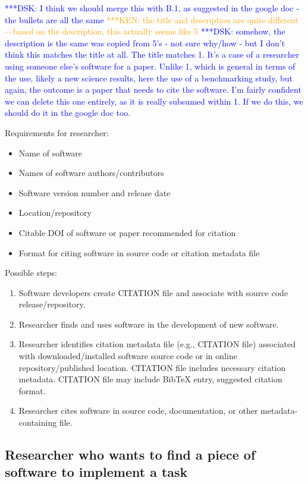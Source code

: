 \documentclass[12pt, oneside]{amsart}
\newcommand{\katznote}[1]{ {\textcolor{blue} { ***DSK: #1 }}} %
\newcommand{\niemnote}[1]{ {\textcolor{orange} { ***KEN: #1 }}} %
\begin{document}
\katznote{I think we should merge this with B.1, as suggested in the google doc - the bullets are all the same}
\niemnote{the title and description are quite different---based on the description, this actually seems like 5} \katznote{somehow, the description is the same was copied from 5's - not sure why/how - but I don't think this matches the title at all.  The title matches 1.  It's a case of a researcher using someone else's software for a paper.  Unlike 1, which is general in terms of the use, likely a new science results, here the use of a benchmarking study, but again, the outcome is a paper that needs to cite the software.  I'm fairly confident we can delete this one entirely, as it is really subsumed within 1.  If we do this, we should do it in the google doc too.}

Requirements for researcher:
\begin{itemize}
\item Name of software
\item Names of software authors/contributors
\item Software version number and release date
\item Location/repository
\item Citable DOI of software or paper recommended for citation
\item Format for citing software in source code or citation metadata file
\end{itemize}

Possible steps:
\begin{enumerate} \setcounter{enumi}{0}
\item Software developers create CITATION file and associate with source code release/repository.
\item Researcher finds and uses software in the development of new software.
\item Researcher identifies citation metadata file (e.g., CITATION file) associated with downloaded/installed software source code or in online repository/published location. CITATION file includes necessary citation metadata. CITATION file may include BibTeX entry, suggested citation format.
\item Researcher cites software in source code, documentation, or other metadata-containing file.
\end{enumerate}

\subsection{Researcher who wants to find a piece of software to implement a task}
\end{document}
